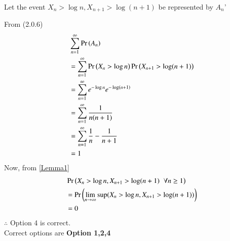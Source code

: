 \documentclass[journal,12pt,twocolumn]{IEEEtran}
\begin{document}
\begin{enumerate}
    Let the event $X_n > \log n,X_{n+1}>\log (n+1)$ be represented by $A_n$'
    
    From (2.0.6)
    \begin{align}
        &\sum_{n=1}^{\infty}\Pr\left(A_n\right)\\
        &= \sum_{n=1}^{\infty}\Pr\left(X_n>\log n\right)\Pr\left(X_{n+1}>\log (n+1)\right)\\
        &=\sum_{n=1}^{\infty}e^{-\log n}e^{-\log (n+1)}\\
        &=\sum_{n=1}^{\infty}\frac{1}{n(n+1)}\\
        &=\sum_{n=1}^{\infty}\frac{1}{n}-\frac{1}{n+1}\\
        &=1
    \end{align}
    Now, from \eqref{Lemma1}
    \begin{align}
        &\Pr\left(X_n>\log n,X_{n+1}>\log (n+1)\hspace{0.2cm}\forall n\geq1\right)\\
        &=\Pr\left(\lim_{n \rightarrow \infty}\sup ( X_n>\log n,X_{n+1}>\log (n+1))\right)\\
        &=0
    \end{align}
    $\therefore$ Option 4 is correct.\\
    Correct options are \textbf{Option 1,2,4}
\end{enumerate}
\end{document}
